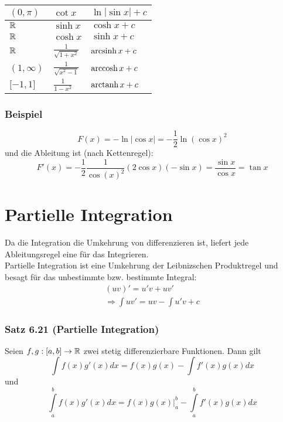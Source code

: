 \begin{tabularx}{\textwidth}{|Y|Y|Y|}
$(0,\pi)$        & $\cot{x}$                             & $\ln \left| {\sin x} \right| + c$                                                                \\[1.5ex]\hline
$\mathbb{R}$ & $\sinh x$ & $\cosh x + c$\\[1.5ex]\hline
$\mathbb{R}$ & $\cosh x$ & $\sinh x + c$\\[1.5ex]\hline
$\mathbb{R}$ & $\frac{1}{\sqrt{1+x^2}}$  & $\operatorname{arcsinh} x + c$ \\[1.5ex]\hline
$(1,\infty)$ & $\frac{1}{\sqrt{x^2-1}}$ & $\operatorname{arccosh} x + c$ \\[1.5ex]\hline
$\lbrack -1,1\rbrack$ & $\frac{1}{1-x^2}$ & $\operatorname{arctanh} x + c$ \\[1.5ex]\hline
 \end{tabularx}

\subsubsection*{Beispiel}
\[F(x)=-\ln\left| \cos x \right| = -\frac{1}{2}\ln\left(\cos x\right)^2\]
und die Ableitung ist (nach Kettenregel):
\[F'(x) =  - \frac{1}{2}\frac{1}{{\cos {{(x)}^2}}}(2\cos x)( - \sin x) = \frac{{\sin x}}{{\cos x}} = \tan x\]

\section{Partielle Integration}
Da die Integration die Umkehrung von differenzieren ist, liefert jede Ableitungsregel eine für das Integrieren.\\

Partielle Integration ist eine Umkehrung der Leibnizschen Produktregel und besagt für das unbestimmte bzw. bestimmte Integral:
\[\begin{array}{c}
(uv)' = u'v + uv'\\
 \Rightarrow \int {uv'}  = uv - \int {u'v}  + c
\end{array}\]

\subsubsection*{Satz 6.21 (Partielle Integration)}
Seien $f,g:\lbrack a,b\rbrack\to\mathbb{R}$ zwei stetig differenzierbare Funktionen. Dann gilt
\[\int {f(x)g'(x)dx = f(x)g(x) - \int {f'(x)g(x)dx} } \]
und
\[\int\limits_a^b {f(x)g'(x)dx = \left. {f(x)g(x)} \right|_a^b - \int\limits_a^b {f'(x)g(x)dx} } \]
